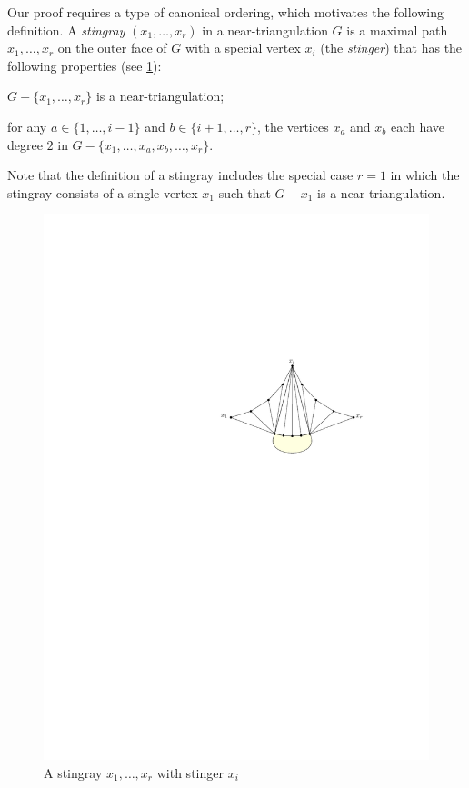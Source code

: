 \documentclass{patmorin}
\newcommand{\defin}[1]{\emph{\color{brightmaroon}#1}}
\begin{document}
Our proof requires a type of canonical ordering, which motivates the following definition. A \defin{stingray} $(x_1,\ldots,x_r)$ in a near-triangulation $G$ is a maximal path $x_1,\ldots,x_r$ on the outer face of $G$ with a special vertex $x_i$ (the \defin{stinger}) that has the following properties (see \cref{crow}):
\begin{compactenum}
  \item $G-\{x_1,\ldots,x_r\}$ is a near-triangulation;
  \item for any $a\in\{1,\ldots,i-1\}$ and $b\in\{i+1,\ldots,r\}$, the vertices $x_a$ and $x_b$ each have degree $2$ in $G-\{x_1,\ldots,x_a,x_b,\ldots,x_r\}$.
\end{compactenum}
Note that the definition of a stingray includes the special case $r=1$ in which the stingray consists of a single vertex $x_1$ such that $G-x_1$ is a near-triangulation.
\begin{figure}
  \begin{center}
    \includegraphics{figs/stingray}
  \end{center}
  \caption{A stingray $x_1,\ldots,x_r$ with stinger $x_i$}
  \label{crow}
\end{figure}
\end{document}
